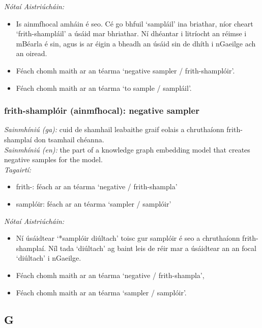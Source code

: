 \documentclass{article}
\begin{document}
 \noindent \textit{Nótaí Aistriúcháin:}
\begin{itemize}
	\item Is ainmfhocal amháin é seo. Cé go bhfuil `sampláil' ina briathar, níor cheart `frith-shampláil' a úsáid mar bhriathar. Ní dhéantar i litríocht an réimse i mBéarla é sin, agus is ar éigin a bheadh an úsáid sin de dhíth i nGaeilge ach an oiread.
	\item Féach chomh maith ar an téarma `negative sampler / frith-shamplóir'.
	\item Féach chomh maith ar an téarma `to sample / sampláil'.
\end{itemize}


\subsubsection*{frith-shamplóir (ainmfhocal): negative sampler}
 \noindent \textit{Sainmhíniú (ga):} cuid de shamhail leabaithe graif eolais a chruthaíonn frith-shamplaí don tsamhail chéanna.
\\
 \noindent \textit{Sainmhíniú (en):} the part of a knowledge graph embedding model that creates negative samples for the model.
\\
 \noindent \textit{Tagairtí:}
\begin{itemize}
	\item frith-: féach ar an téarma `negative / frith-shampla'
	\item samplóir: féach ar an téarma `sampler / samplóir'
\end{itemize}

 \noindent \textit{Nótaí Aistriúcháin:}
\begin{itemize}
	\item Ní úsáidtear `*samplóir diúltach' toisc gur samplóir é seo a chruthaíonn frith-shamplaí. Níl tada `diúltach' ag baint leis de réir mar a úsáidtear an an focal `diúltach' i nGaeilge.
	\item Féach chomh maith ar an téarma `negative / frith-shampla',
	\item Féach chomh maith ar an téarma `sampler / samplóir'.
\end{itemize}


\subsection*{G}
\end{document}
